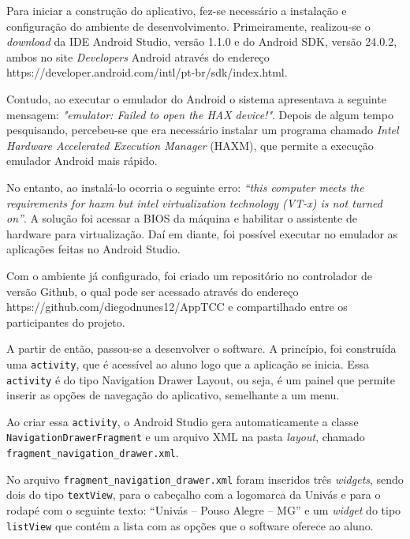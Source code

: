 
	\par Para iniciar a construção do aplicativo, fez-se necessário a instalação e
configuração do ambiente de desenvolvimento. Primeiramente, realizou-se o
\textit{download} da IDE Android Studio, versão 1.1.0 e do Android SDK, versão
24.0.2, ambos no site \textit{Developers} Android através do endereço
https://developer.android.com/intl/pt-br/sdk/index.html.

	\par Contudo, ao executar o emulador do Android o sistema apresentava a
seguinte mensagem: \textit{"emulator: Failed to open the HAX device!"}.
Depois de algum tempo pesquisando, percebeu-se que era necessário instalar um programa
chamado \textit{Intel Hardware Accelerated Execution Manager} (HAXM), que
permite a execução emulador Android mais rápido.

	\par No entanto, ao instalá-lo ocorria o seguinte erro:\textit{ “this computer
meets the requirements for haxm but intel virtualization technology (VT-x) is
not turned on”}.  A solução foi acessar a BIOS da máquina e habilitar o
assistente de hardware para virtualização. Daí em diante, foi possível executar
no emulador as aplicações feitas no Android Studio.

	\par Com o ambiente já configurado, foi criado um repositório no controlador de
versão Github, o qual pode ser acessado através do endereço
https://github.com/diegodnunes12/AppTCC e compartilhado entre os participantes
do projeto.

	\par A partir de então, passou-se a desenvolver o software. A princípio, foi
construída uma \texttt{activity}, que é acessível ao aluno logo que a aplicação
se inicia. Essa \texttt{activity} é do tipo Navigation Drawer Layout, ou seja,
é um painel que permite inserir as opções de navegação do aplicativo,
semelhante a um menu.

	\par Ao criar essa \texttt{activity}, o Android Studio gera automaticamente
a classe \texttt{NavigationDrawerFragment} e um arquivo XML na pasta
\textit{layout}, chamado \texttt{fragment\_navigation\_drawer.xml}.

	\par No arquivo \texttt{fragment\_navigation\_drawer.xml} foram inseridos três
\textit{widgets}, sendo dois do tipo \texttt{textView}, para o cabeçalho com a
logomarca da Univás e para o rodapé com o seguinte texto: “Univás – Pouso
Alegre – MG” e um \textit{widget} do tipo \texttt{listView} que contém a lista
com as opções que o software oferece ao aluno.

